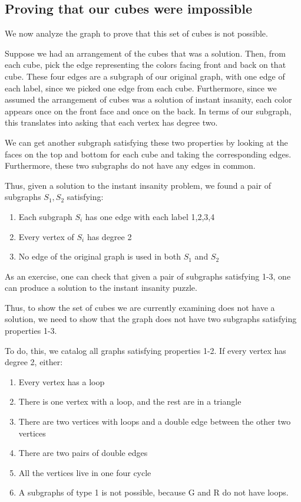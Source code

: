 \documentclass[10pt,]{book}
\theoremstyle{plain}
\theoremstyle{definition}
\theoremstyle{definition}
\theoremstyle{definition}
\theoremstyle{definition}
\numberwithin{equation}{section}
\begin{document}
\subsection[{Proving that our cubes were impossible}]{Proving that our cubes were impossible}\label{subsection-12}
\hypertarget{p-62}{}%
We now analyze the graph to prove that this set of cubes is not possible.%
\par
\hypertarget{p-63}{}%
Suppose we had an arrangement of the cubes that was a solution. Then, from each cube, pick the edge representing the colors facing front and back on that cube. These four edges are a subgraph of our original graph, with one edge of each label, since we picked one edge from each cube. Furthermore, since we assumed the arrangement of cubes was a solution of instant insanity, each color appears once on the front face and once on the back. In terms of our subgraph, this translates into asking that each vertex has degree two.%
\par
\hypertarget{p-64}{}%
We can get another subgraph satisfying these two properties by looking at the faces on the top and bottom for each cube and taking the corresponding edges. Furthermore, these two subgraphs do not have any edges in common.%
\par
\hypertarget{p-65}{}%
Thus, given a solution to the instant insanity problem, we found a pair of subgraphs \(S_1, S_2\) satisfying: \leavevmode%
\begin{enumerate}
\item\hypertarget{li-11}{}Each subgraph \(S_i\) has one edge with each label 1,2,3,4%
\item\hypertarget{li-12}{}Every vertex of \(S_i\) has degree 2%
\item\hypertarget{li-13}{}No edge of the original graph is used in both \(S_1\) and \(S_2\)%
\end{enumerate}
 As an exercise, one can check that given a pair of subgraphs satisfying 1-3, one can produce a solution to the instant insanity puzzle.%
\par
\hypertarget{p-66}{}%
Thus, to show the set of cubes we are currently examining does not have a solution, we need to show that the graph does not have two subgraphs satisfying properties 1-3.%
\par
\hypertarget{p-67}{}%
To do, this, we catalog all graphs satisfying properties 1-2. If every vertex has degree 2, either: \leavevmode%
\begin{enumerate}
\item\hypertarget{li-14}{}Every vertex has a loop%
\item\hypertarget{li-15}{}There is one vertex with a loop, and the rest are in a triangle%
\item\hypertarget{li-16}{}There are two vertices with loops and a double edge between the other two vertices%
\item\hypertarget{li-17}{}There are two pairs of double edges%
\item\hypertarget{li-18}{}All the vertices live in one four cycle%
\item\hypertarget{li-19}{}A subgraphs of type 1 is not possible, because G and R do not have loops.%
\end{enumerate}
\end{document}
